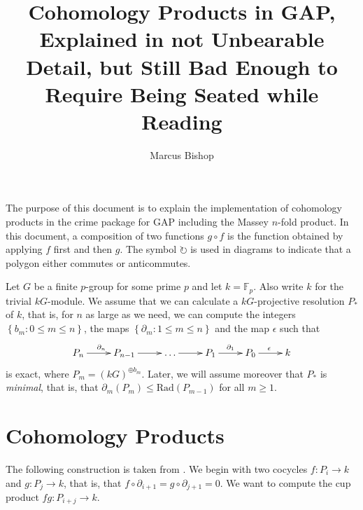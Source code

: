 \documentclass[12pt]{article}
\title{Cohomology Products in \textsf{GAP}, Explained in not Unbearable 
Detail, but Still Bad Enough to Require Being Seated while Reading}
\author{Marcus Bishop}
\begin{document}
\maketitle
The purpose of this document is to explain
the implementation of cohomology products in the 
\textsf{crime} package for \textsf{GAP} including the Massey $n$-fold
product. In this document, a composition of two functions
$g\circ f$ is the function obtained by applying $f$ first 
and then $g$. The symbol $\circlearrowright$ is used
in diagrams to indicate that a polygon either commutes
or anticommutes. 

Let $G$ be a finite $p$-group for some prime $p$
and let $k=\mathbb{F}_p$. Also write $k$ for the
trivial $kG$-module. We assume that we can
calculate a $kG$-projective resolution $P_\ast$
of $k$, that is, for $n$ as large as we need,
we can compute the integers
$\left\{b_m:0\le m\le n\right\}$, the
maps $\left\{\partial_m:1\le m\le n\right\}$
and the map $\epsilon$ such that
\begin{equation}\label{proj}
\xymatrix{P_n\ar[r]^{\partial_n}
&P_{n-1}\ar[r]&\dots\ar[r]
&P_1\ar[r]^{\partial_1}
&P_0\ar[r]^{\epsilon}&k}\end{equation}
is exact, where $P_m=\left(kG\right)^{\oplus b_m}$.
Later, we will assume moreover that $P_\ast$ is {\em minimal},
that is, that $\partial_m\left(P_m\right)\le 
\mathrm{Rad}\left(P_{m-1}\right)$ for all $m\ge 1$.

\section{Cohomology Products}\label{cp}
The following construction is taken from \cite{carlson}.
We begin with two cocycles $f:P_i\to k$ and $g:P_j\to k$,
that is, that $f\circ\partial_{i+1}=g\circ\partial_{j+1}=0$.
We want to compute the cup product $fg:P_{i+j}\to k$.
\end{document}
